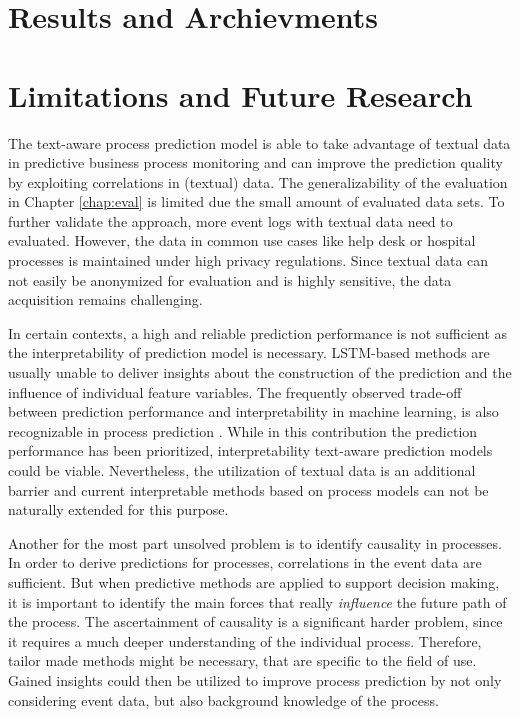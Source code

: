 
\section{Results and Archievments}

\section{Limitations and Future Research}

The text-aware process prediction model is able to take advantage of textual data in predictive business process monitoring and can improve the prediction quality by exploiting correlations in (textual) data.
The generalizability of the evaluation in Chapter \ref{chap:eval} is limited due the small amount of evaluated data sets.
To further validate the approach, more event logs with textual data need to evaluated.
However, the data in common use cases like help desk or hospital processes is maintained under high privacy regulations.
Since textual data can not easily be anonymized for evaluation and is highly sensitive, the data acquisition remains challenging.

In certain contexts, a high and reliable prediction performance is not sufficient as the interpretability of prediction model is necessary.
LSTM-based methods are usually unable to deliver insights about the construction of the prediction and the influence of individual feature variables.
The frequently observed trade-off between prediction performance and interpretability in machine learning, is also recognizable in process prediction \cite{DBLP:journals/corr/abs-1811-00062}.
While in this contribution the prediction performance has been prioritized, interpretability text-aware prediction models could be viable.
Nevertheless, the utilization of textual data is an additional barrier and current interpretable methods based on process models can not be naturally extended for this purpose.

Another for the most part unsolved problem is to identify causality in processes.
In order to derive predictions for processes, correlations in the event data are sufficient.
But when predictive methods are applied to support decision making, it is important to identify the main forces that really \textit{influence} the future path of the process.
The ascertainment of causality is a significant harder problem, since it requires a much deeper understanding of the individual process.
Therefore, tailor made methods might be necessary, that are specific to the field of use.
Gained insights could then be utilized to improve process prediction by not only considering event data, but also background knowledge of the process.
